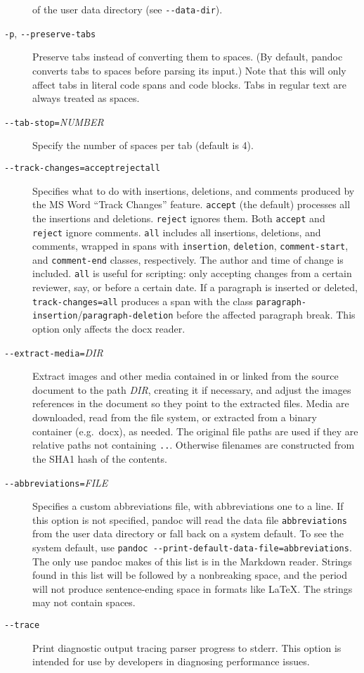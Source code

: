 \begin{description}
of the user data directory (see \texttt{-\/-data-dir}).
\item[\texttt{-p}, \texttt{-\/-preserve-tabs}]
Preserve tabs instead of converting them to spaces. (By default, pandoc
converts tabs to spaces before parsing its input.) Note that this will
only affect tabs in literal code spans and code blocks. Tabs in regular
text are always treated as spaces.
\item[\texttt{-\/-tab-stop=}\emph{NUMBER}]
Specify the number of spaces per tab (default is 4).
\item[\texttt{-\/-track-changes=accept}\textbar{}\texttt{reject}\textbar{}\texttt{all}]
Specifies what to do with insertions, deletions, and comments produced
by the MS Word ``Track Changes'' feature. \texttt{accept} (the default)
processes all the insertions and deletions. \texttt{reject} ignores
them. Both \texttt{accept} and \texttt{reject} ignore comments.
\texttt{all} includes all insertions, deletions, and comments, wrapped
in spans with \texttt{insertion}, \texttt{deletion},
\texttt{comment-start}, and \texttt{comment-end} classes, respectively.
The author and time of change is included. \texttt{all} is useful for
scripting: only accepting changes from a certain reviewer, say, or
before a certain date. If a paragraph is inserted or deleted,
\texttt{track-changes=all} produces a span with the class
\texttt{paragraph-insertion}/\texttt{paragraph-deletion} before the
affected paragraph break. This option only affects the docx reader.
\item[\texttt{-\/-extract-media=}\emph{DIR}]
Extract images and other media contained in or linked from the source
document to the path \emph{DIR}, creating it if necessary, and adjust
the images references in the document so they point to the extracted
files. Media are downloaded, read from the file system, or extracted
from a binary container (e.g.~docx), as needed. The original file paths
are used if they are relative paths not containing \texttt{..}.
Otherwise filenames are constructed from the SHA1 hash of the contents.
\item[\texttt{-\/-abbreviations=}\emph{FILE}]
Specifies a custom abbreviations file, with abbreviations one to a line.
If this option is not specified, pandoc will read the data file
\texttt{abbreviations} from the user data directory or fall back on a
system default. To see the system default, use
\texttt{pandoc\ -\/-print-default-data-file=abbreviations}. The only use
pandoc makes of this list is in the Markdown reader. Strings found in
this list will be followed by a nonbreaking space, and the period will
not produce sentence-ending space in formats like LaTeX. The strings may
not contain spaces.
\item[\texttt{-\/-trace}]
Print diagnostic output tracing parser progress to stderr. This option
is intended for use by developers in diagnosing performance issues.
\end{description}

